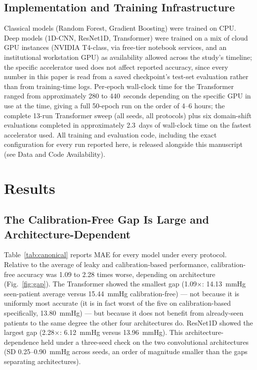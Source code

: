 \documentclass[journal]{IEEEtran}
\begin{document}
\subsection{Implementation and Training Infrastructure}
Classical models (Random Forest, Gradient Boosting) were trained on CPU. Deep models (1D-CNN, ResNet1D, Transformer) were trained on a mix of cloud GPU instances (NVIDIA T4-class, via free-tier notebook services, and an institutional workstation GPU) as availability allowed across the study's timeline; the specific accelerator used does not affect reported accuracy, since every number in this paper is read from a saved checkpoint's test-set evaluation rather than from training-time logs. Per-epoch wall-clock time for the Transformer ranged from approximately 280 to 440~seconds depending on the specific GPU in use at the time, giving a full 50-epoch run on the order of 4--6 hours; the complete 13-run Transformer sweep (all seeds, all protocols) plus six domain-shift evaluations completed in approximately 2.3~days of wall-clock time on the fastest accelerator used. All training and evaluation code, including the exact configuration for every run reported here, is released alongside this manuscript (see Data and Code Availability).

\section{Results}

\subsection{The Calibration-Free Gap Is Large and Architecture-Dependent}
Table~\ref{tab:canonical} reports MAE for every model under every protocol. Relative to the average of leaky and calibration-based performance, calibration-free accuracy was 1.09 to 2.28 times worse, depending on architecture (Fig.~\ref{fig:gap}). The Transformer showed the smallest gap (1.09$\times$: 14.13~mmHg seen-patient average versus 15.44~mmHg calibration-free) --- not because it is uniformly most accurate (it is in fact worst of the five on calibration-based specifically, 13.80~mmHg) --- but because it does not benefit from already-seen patients to the same degree the other four architectures do. ResNet1D showed the largest gap (2.28$\times$: 6.12~mmHg versus 13.96~mmHg). This architecture-dependence held under a three-seed check on the two convolutional architectures (SD 0.25--0.90~mmHg across seeds, an order of magnitude smaller than the gaps separating architectures).
\end{document}
